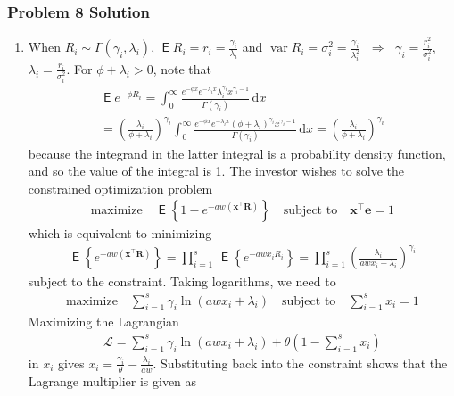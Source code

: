 \documentclass[10pt]{beamer}
\newcommand{\ds}{\displaystyle}
\newcommand{\ie}{\;\Longrightarrow\;}
\DeclareMathOperator\expc{\mathsf{E}}
\DeclareMathOperator\var{var}
\theoremstyle{definition}
\begin{document}
\begin{frame}[allowframebreaks]
  \frametitle{Problem 8 Solution}
  \begin{enumerate}
    \item When $R_i\sim\Gamma(\gamma_i, \lambda_i)$, $\ds\expc{R_i} = r_i = \frac{\gamma_i}{\lambda_i}$ and $\ds\var{R_i} = \sigma_i^2 = \frac{\gamma_i}{\lambda_i^2}$ $\ie$ $\ds\gamma_i = \frac{r_i^2}{\sigma_i^2}$, $\ds\lambda_i = \frac{r_i}{\sigma_i^2}$. For $\phi + \lambda_i > 0$, note that
    \begin{multline*}
      \expc{e^{-\phi R_i}} = \int_0^\infty \frac{e^{-\phi x}e^{-\lambda_i x}\lambda_i^{\gamma_i}x^{\gamma_i-1}}{\Gamma(\gamma_i)}\,\text{d}x \\= \left(\frac{\lambda_i}{\phi + \lambda_i}\right)^{\gamma_i} \int_0^\infty \frac{e^{-\phi x}e^{-\lambda_i x}(\phi + \lambda_i)^{\gamma_i}x^{\gamma_i-1}}{\Gamma(\gamma_i)}\,\text{d}x = \left(\frac{\lambda_i}{\phi + \lambda_i}\right)^{\gamma_i}
    \end{multline*}
    because the integrand in the latter integral is a probability density function, and so the value of the integral is 1. The investor wishes to solve the constrained optimization problem
    \begin{align*}
      \text{maximize}\quad \expc\left\{1 - e^{-aw(\mathbf{x}^\top\mathbf{R})}\right\} \quad\text{subject to}\quad \mathbf{x}^\top\mathbf{e} = 1
    \end{align*}
    which is equivalent to minimizing
    \begin{align*}
      \expc\left\{e^{-aw(\mathbf{x}^\top\mathbf{R})}\right\} = \prod_{i=1}^s\,\expc\left\{e^{-awx_i R_i}\right\} = \prod_{i=1}^s \left(\frac{\lambda_i}{awx_i + \lambda_i}\right)^{\gamma_i}
    \end{align*}
    subject to the constraint. Taking logarithms, we need to
    \begin{align*}
      \text{maximize} \quad \sum_{i=1}^s \gamma_i \ln(awx_i + \lambda_i) \quad \text{subject to} \quad \sum_{i=1}^s x_i = 1
    \end{align*}
    Maximizing the Lagrangian
    \begin{align*}
      \mathcal{L} = \sum_{i=1}^s \gamma_i \ln(awx_i + \lambda_i) + \theta\left(1 - \sum_{i=1}^s x_i\right)
    \end{align*}
    in $x_i$ gives $\ds x_i = \frac{\gamma_i}{\theta} - \frac{\lambda_i}{aw}$. Substituting back into the constraint shows that the Lagrange multiplier is given as
    \begin{align*}

\end{align*}
\end{enumerate}
\end{frame}
\end{document}

